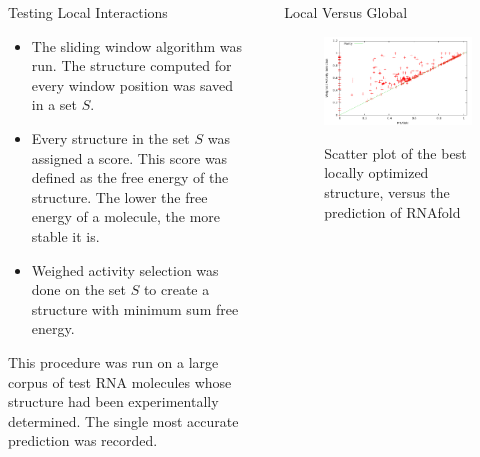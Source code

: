 \documentclass[final]{beamer}
\newlength{\sepwid}
\newlength{\onecolwid}
\begin{document}
\begin{frame}[t]
\begin{columns}[t]
\begin{column}{\onecolwid}
\begin{block}{Testing Local Interactions}
\vspace{0.25in}
\begin{itemize}
\item The sliding window algorithm was run. The structure computed for every window position was saved in a set $S$. \\
\item Every structure in the set $S$ was assigned a score. This score was defined as the free energy of the structure. The lower the free energy of a molecule, the more stable it is. \\
\item Weighed activity selection was done on the set $S$ to create a structure with minimum sum free energy.
\end{itemize}
\vspace{0.25in}
This procedure was run on a large corpus of test RNA molecules whose structure had been experimentally determined. The single most accurate prediction was recorded.

         
          \end{block} 
    
    \end{column}
    
    
    
    
    
    
 \begin{column}{\sepwid}\end{column}			%
    \begin{column}{\onecolwid}
    
    
    
    \begin{block}{Local Versus Global}

        \begin{figure}
          \begin{center}
            \includegraphics[width=10in]{wasrnafoldplot.pdf} \\
            \caption{Scatter plot of the best locally optimized structure, versus the prediction of RNAfold}
            \label{fig:wasvsrnafoldplot}
          \end{center}
        \end{figure}            
            \vspace{0.25in}


\end{block}
\end{column}
\end{columns}
\end{frame}
\end{document}
